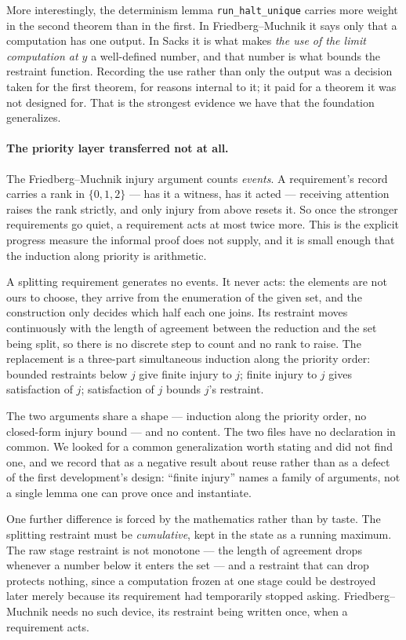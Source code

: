 More interestingly, the determinism lemma \texttt{run\_halt\_unique} carries
more weight in the second theorem than in the first.  In
Friedberg--Muchnik it says only that a computation has one output.  In
Sacks it is what makes \emph{the use of the limit computation at $y$} a
well-defined number, and that number is what bounds the restraint function.
Recording the use rather than only the output was a decision taken for the
first theorem, for reasons internal to it; it paid for a theorem it was not
designed for.  That is the strongest evidence we have that the foundation
generalizes.

\paragraph{The priority layer transferred not at all.}
The Friedberg--Muchnik injury argument counts \emph{events}.  A
requirement's record carries a rank in $\{0,1,2\}$ --- has it a witness,
has it acted --- receiving attention raises the rank strictly, and only
injury from above resets it.  So once the stronger requirements go quiet, a
requirement acts at most twice more.  This is the explicit progress measure
the informal proof does not supply, and it is small enough that the
induction along priority is arithmetic.

A splitting requirement generates no events.  It never acts: the elements
are not ours to choose, they arrive from the enumeration of the given set,
and the construction only decides which half each one joins.  Its restraint
moves continuously with the length of agreement between the reduction and
the set being split, so there is no discrete step to count and no rank to
raise.  The replacement is a three-part simultaneous induction along the
priority order: bounded restraints below $j$ give finite injury to $j$;
finite injury to $j$ gives satisfaction of $j$; satisfaction of $j$ bounds
$j$'s restraint.

The two arguments share a shape --- induction along the priority order, no
closed-form injury bound --- and no content.  The two files have no
declaration in common.  We looked for a common generalization worth stating
and did not find one, and we record that as a negative result about reuse
rather than as a defect of the first development's design: ``finite
injury'' names a family of arguments, not a single lemma one can prove once
and instantiate.

One further difference is forced by the mathematics rather than by taste.
The splitting restraint must be \emph{cumulative}, kept in the state as a
running maximum.  The raw stage restraint is not monotone --- the length of
agreement drops whenever a number below it enters the set --- and a
restraint that can drop protects nothing, since a computation frozen at one
stage could be destroyed later merely because its requirement had
temporarily stopped asking.  Friedberg--Muchnik needs no such device, its
restraint being written once, when a requirement acts.

